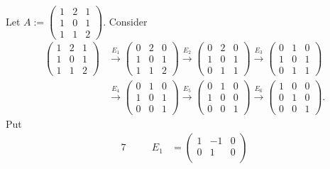 \begin{Exercise}
	\begin{solution}
		Let $A := \begin{pmatrix}
		1 & 2 & 1 \\
		1 & 0 & 1 \\
		1 & 1 & 2
		\end{pmatrix}$.
		Consider
		\begin{align*}
		\begin{pmatrix}
		1 & 2 & 1 \\
		1 & 0 & 1 \\
		1 & 1 & 2
		\end{pmatrix} &\overset{E_1}{\longrightarrow} \begin{pmatrix}
		0 & 2 & 0 \\
		1 & 0 & 1 \\
		1 & 1 & 2
		\end{pmatrix} \overset{E_2}{\longrightarrow} \begin{pmatrix}
		0 & 2 & 0 \\
		1 & 0 & 1 \\
		0 & 1 & 1
		\end{pmatrix} \overset{E_3}{\longrightarrow} \begin{pmatrix}
		0 & 1 & 0 \\
		1 & 0 & 1 \\
		0 & 1 & 1
		\end{pmatrix} \\
		&\overset{E_4}{\longrightarrow} \begin{pmatrix}
		0 & 1 & 0 \\
		1 & 0 & 1 \\
		0 & 0 & 1
		\end{pmatrix} \overset{E_5}{\longrightarrow} \begin{pmatrix}
		0 & 1 & 0 \\
		1 & 0 & 0 \\
		0 & 0 & 1
		\end{pmatrix} \overset{E_6}{\longrightarrow} \begin{pmatrix}
		1 & 0 & 0 \\
		0 & 1 & 0 \\
		0 & 0 & 1
		\end{pmatrix}.
		\end{align*}
		Put 
		\begin{alignat*}{7}
		\quad&& E_1 &= \begin{pmatrix}
		1 & -1 & 0 \\
		0 & 1 & 0 \\

\end{pmatrix}
\end{alignat*}
\end{solution}
\end{Exercise}
